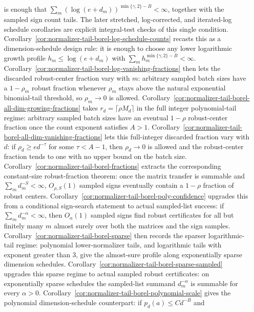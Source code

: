 \documentclass[11pt]{amsart}
\numberwithin{equation}{section}
\theoremstyle{definition}
\theoremstyle{remark}
\begin{document}
is enough that \(\sum_m(\log(e+d_m))^{\min\{\gamma,2\}-B}<\infty\), together
with the sampled sign count tails.  The later stretched, log-corrected, and
iterated-log schedule corollaries are explicit integral-test checks of this
single condition.
Corollary~\ref{cor:normalizer-tail-borel-log-schedule-counts} recasts this as a
dimension-schedule design rule: it is enough to choose any lower logarithmic
growth profile \(h_m\le\log(e+d_m)\) with
\(\sum_m h_m^{\min\{\gamma,2\}-B}<\infty\).
Corollary~\ref{cor:normalizer-tail-borel-log-vanishing-fractions} then lets the
discarded robust-center fraction vary with \(m\): arbitrary sampled batch sizes
have a \(1-\rho_m\) robust fraction whenever \(\rho_m\) stays above the natural
exponential binomial-tail threshold, so \(\rho_m\to0\) is allowed.
Corollary~\ref{cor:normalizer-tail-borel-all-dim-growing-fractions} takes
\(r_d=\lceil\rho M_d\rceil\) in the full integer polynomial-tail regime:
arbitrary sampled batch sizes have an eventual \(1-\rho\) robust-center
fraction once the count exponent satisfies \(A>1\).
Corollary~\ref{cor:normalizer-tail-borel-all-dim-vanishing-fractions} lets this
full-integer discarded fraction vary with \(d\): if
\(\rho_d\ge e d^{-\tau}\) for some \(\tau<A-1\), then \(\rho_d\to0\) is allowed
and the robust-center fraction tends to one with no upper bound on the batch
size.
Corollary~\ref{cor:normalizer-tail-borel-fractions} extracts the corresponding
constant-size robust-fraction theorem: once the matrix transfer is summable and
\(\sum_m d_m^{-S}<\infty\), \(O_{\rho,S}(1)\) sampled signs eventually contain
a \(1-\rho\) fraction of robust centers.
Corollary~\ref{cor:normalizer-tail-borel-poly-confidence} upgrades this from a
conditional sign-search statement to actual sampled-list success: if
\(\sum_m d_m^{-\alpha}<\infty\), then \(O_\alpha(1)\) sampled signs find robust
certificates for all but finitely many \(m\) almost surely over both the matrices
and the sign samples.
Corollary~\ref{cor:normalizer-tail-borel-sparse} then records the sparser
logarithmic-tail regime: polynomial lower-normalizer tails, and logarithmic
tails with exponent greater than \(3\), give the almost-sure profile along
exponentially sparse dimension schedules.
Corollary~\ref{cor:normalizer-tail-borel-sparse-sampled} upgrades this sparse
regime to actual sampled robust certificates: on exponentially sparse schedules
the sampled-list summand \(d_m^{-\alpha}\) is summable for every \(\alpha>0\).
Corollary~\ref{cor:normalizer-tail-borel-polynomial-scale} gives the polynomial
dimension-schedule counterpart: if \(p_d(a)\le C d^{-B}\) and
\end{document}
